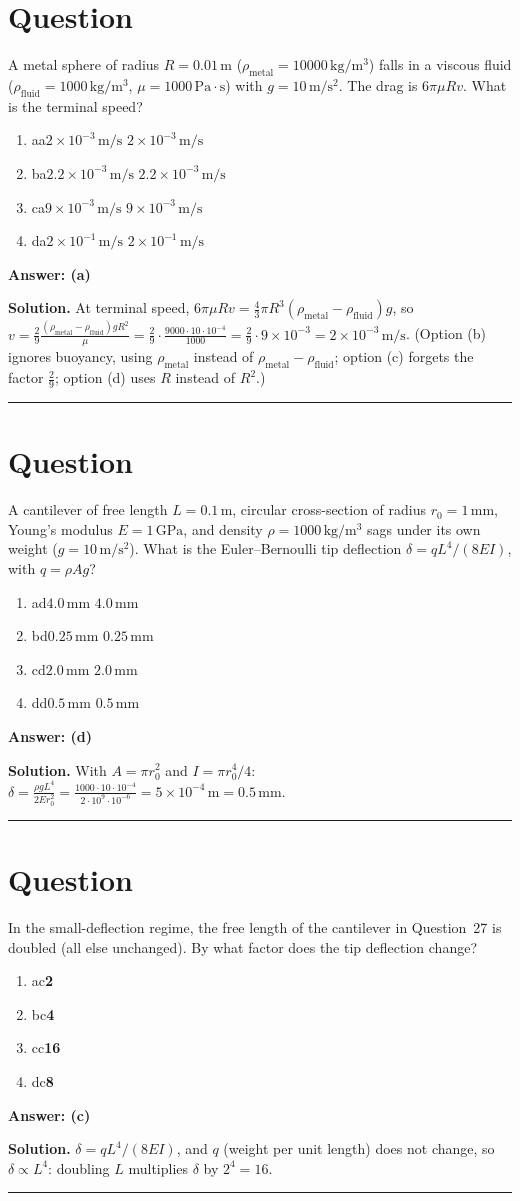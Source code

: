 \documentclass[letterpaper,11pt]{article}
\newcounter{qnum}
\newcommand{\opt}[3]{\item \if#1#2{\boldmath\textbf{#3}} \quad \textcolor{OliveGreen}{\checkmark}\else #3\fi}
\newcommand{\sol}[7]{%
  \stepcounter{qnum}%
  \section*{Question \theqnum}
  #1
  \begin{enumerate}[label=(\alph*)]
    \opt{a}{#6}{#2}
    \opt{b}{#6}{#3}
    \opt{c}{#6}{#4}
    \opt{d}{#6}{#5}
  \end{enumerate}
  \vspace{1mm}
  \textbf{Answer: (#6)}

  \textbf{Solution.} #7

  \vspace{2mm}\hrule
}
\begin{document}
%
%
\sol{A metal sphere of radius $R = 0.01\,\mathrm{m}$ ($\rho_{\text{metal}} = 10000\,\mathrm{kg/m^3}$) falls in a viscous fluid ($\rho_{\text{fluid}} = 1000\,\mathrm{kg/m^3}$, $\mu = 1000\,\mathrm{Pa \cdot s}$) with $g = 10\,\mathrm{m/s^2}$. The drag is $6\pi\mu R v$. What is the terminal speed?}
  {$2 \times 10^{-3}\,\mathrm{m/s}$}
  {$2.2 \times 10^{-3}\,\mathrm{m/s}$}
  {$9 \times 10^{-3}\,\mathrm{m/s}$}
  {$2 \times 10^{-1}\,\mathrm{m/s}$}
  {a}
  {At terminal speed, $6\pi\mu R v = \frac{4}{3}\pi R^3 (\rho_{\text{metal}} - \rho_{\text{fluid}}) g$, so $v = \frac{2}{9}\frac{(\rho_{\text{metal}} - \rho_{\text{fluid}}) g R^2}{\mu} = \frac{2}{9} \cdot \frac{9000 \cdot 10 \cdot 10^{-4}}{1000} = \frac{2}{9} \cdot 9 \times 10^{-3} = 2 \times 10^{-3}\,\mathrm{m/s}$. (Option (b) ignores buoyancy, using $\rho_{\text{metal}}$ instead of $\rho_{\text{metal}} - \rho_{\text{fluid}}$; option (c) forgets the factor $\frac{2}{9}$; option (d) uses $R$ instead of $R^2$.)}

%
%
\sol{A cantilever of free length $L = 0.1\,\mathrm{m}$, circular cross-section of radius $r_0 = 1\,\mathrm{mm}$, Young's modulus $E = 1\,\mathrm{GPa}$, and density $\rho = 1000\,\mathrm{kg/m^3}$ sags under its own weight ($g = 10\,\mathrm{m/s^2}$). What is the Euler--Bernoulli tip deflection $\delta = q L^4 / (8EI)$, with $q = \rho A g$?}
  {$4.0\,\mathrm{mm}$}
  {$0.25\,\mathrm{mm}$}
  {$2.0\,\mathrm{mm}$}
  {$0.5\,\mathrm{mm}$}
  {d}
  {With $A = \pi r_0^2$ and $I = \pi r_0^4/4$: $\delta = \frac{\rho g L^4}{2 E r_0^2} = \frac{1000 \cdot 10 \cdot 10^{-4}}{2 \cdot 10^9 \cdot 10^{-6}} = 5 \times 10^{-4}\,\mathrm{m} = 0.5\,\mathrm{mm}$.}

%
%
\sol{In the small-deflection regime, the free length of the cantilever in Question~27 is doubled (all else unchanged). By what factor does the tip deflection change?}
  {2}
  {4}
  {16}
  {8}
  {c}
  {$\delta = q L^4/(8EI)$, and $q$ (weight per unit length) does not change, so $\delta \propto L^4$: doubling $L$ multiplies $\delta$ by $2^4 = 16$.}
\end{document}
